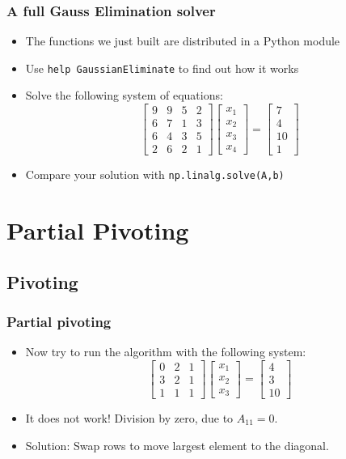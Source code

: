 \begin{frame}[fragile]
  \frametitle{A full Gauss Elimination solver}
  \begin{itemize}
    \item The functions we just built are distributed in a Python module
    \item Use \lstinline$help GaussianEliminate$ to find out how it works
    \item Solve the following system of equations:
    \[
    \begin{bmatrix}
      9 & 9 & 5 & 2\\ 
      6 & 7 & 1 & 3\\ 
      6 & 4 & 3 & 5\\
      2 & 6 & 2 & 1
    \end{bmatrix}
    \begin{bmatrix}x_1\\x_2\\x_3\\x_4\end{bmatrix} = 
    \begin{bmatrix}7\\4\\10\\1\end{bmatrix}
  \]
  \item Compare your solution with \lstinline$np.linalg.solve(A,b)$
  \end{itemize}
\end{frame}

\section{Partial Pivoting}
\subsection*{Pivoting}

\begin{frame}[fragile]
  \frametitle{Partial pivoting}
  \begin{itemize}
    \item Now try to run the algorithm with the following system:
    \[
    \begin{bmatrix}
      0 & 2 & 1\\ 
      3 & 2 & 1 \\ 
      1 & 1 & 1
    \end{bmatrix}
    \begin{bmatrix}x_1\\x_2\\x_3\end{bmatrix} = 
    \begin{bmatrix}4\\3\\10\end{bmatrix}
  \]
  \pause
  \item It does not work! Division by zero, due to $A_{11}=0$.
  \item Solution: Swap rows to move largest element to the diagonal.
  \end{itemize}
\end{frame}

